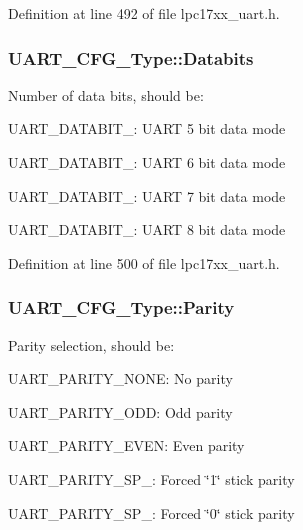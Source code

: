 \-Definition at line 492 of file lpc17xx\-\_\-uart.\-h.

\hypertarget{struct_u_a_r_t___c_f_g___type_a9186b2309198fd63e0ef9d078c265220}{
\subsubsection[{\-Databits}]{ {\bf \-U\-A\-R\-T\-\_\-\-C\-F\-G\-\_\-\-Type\-::\-Databits}}}\label{struct_u_a_r_t___c_f_g___type_a9186b2309198fd63e0ef9d078c265220}
\-Number of data bits, should be\-:
\begin{DoxyItemize}
\item \-U\-A\-R\-T\-\_\-\-D\-A\-T\-A\-B\-I\-T\-\_\-: \-U\-A\-R\-T 5 bit data mode
\item \-U\-A\-R\-T\-\_\-\-D\-A\-T\-A\-B\-I\-T\-\_\-: \-U\-A\-R\-T 6 bit data mode
\item \-U\-A\-R\-T\-\_\-\-D\-A\-T\-A\-B\-I\-T\-\_\-: \-U\-A\-R\-T 7 bit data mode
\item \-U\-A\-R\-T\-\_\-\-D\-A\-T\-A\-B\-I\-T\-\_\-: \-U\-A\-R\-T 8 bit data mode 
\end{DoxyItemize}

\-Definition at line 500 of file lpc17xx\-\_\-uart.\-h.

\hypertarget{struct_u_a_r_t___c_f_g___type_aabca9f673560eb77a5c3136e766c55e4}{
\subsubsection[{\-Parity}]{ {\bf \-U\-A\-R\-T\-\_\-\-C\-F\-G\-\_\-\-Type\-::\-Parity}}}\label{struct_u_a_r_t___c_f_g___type_aabca9f673560eb77a5c3136e766c55e4}
\-Parity selection, should be\-:
\begin{DoxyItemize}
\item \-U\-A\-R\-T\-\_\-\-P\-A\-R\-I\-T\-Y\-\_\-\-N\-O\-N\-E\-: \-No parity
\item \-U\-A\-R\-T\-\_\-\-P\-A\-R\-I\-T\-Y\-\_\-\-O\-D\-D\-: \-Odd parity
\item \-U\-A\-R\-T\-\_\-\-P\-A\-R\-I\-T\-Y\-\_\-\-E\-V\-E\-N\-: \-Even parity
\item \-U\-A\-R\-T\-\_\-\-P\-A\-R\-I\-T\-Y\-\_\-\-S\-P\-\_\-: \-Forced \char`\"{}1\char`\"{} stick parity
\item \-U\-A\-R\-T\-\_\-\-P\-A\-R\-I\-T\-Y\-\_\-\-S\-P\-\_\-: \-Forced \char`\"{}0\char`\"{} stick parity 
\end{DoxyItemize}

